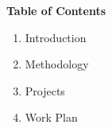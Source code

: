 \documentclass[draft]{agujournal2019}
\begin{document}

\noindent\textbf{Table of Contents}

\begin{enumerate}
    \item Introduction 
    \item Methodology 
    \item Projects 
    \item Work Plan 
\end{enumerate}


%
%

%
%



\end{document}
